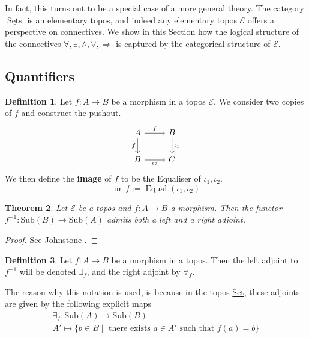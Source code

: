 \documentclass{birkjour}
\theoremstyle{plain}
\newtheorem{thm}{Theorem}[subsection] %
\theoremstyle{definition}
\newtheorem{definition}[thm]{Definition} %
\newcommand{\call}[1]{\mathcal{#1}}
\newcommand{\lto}{\longrightarrow}
\begin{document}
	In fact, this turns out to be a special case of a more general theory. The category $\underline{\operatorname{Sets}}$ is an elementary topos, and indeed any elementary topos $\call{E}$ offers a perspective on connectives. We show in this Section how the logical structure of the connectives $\forall, \exists, \wedge, \vee, \Rightarrow$ is captured by the categorical structure of $\call{E}$.
	\subsection{Quantifiers}
	\begin{definition}\label{def:image}
		Let $f: A \lto B$ be a morphism in a topos $\call{E}$. We consider two copies of $f$ and construct the pushout.
		\begin{equation}
			\begin{tikzcd}
				A\arrow[r,"{f}"]\arrow[d,swap,"{f}"] & B\arrow[d,"{\iota_1}"]\\
				B\arrow[r,swap,"{\iota_2}"] & C
			\end{tikzcd}
		\end{equation}
		We then define the \textbf{image} of $f$ to be the Equaliser of $\iota_1,\iota_2$.
		\begin{equation}
			\operatorname{im}f := \operatorname{Equal}(\iota_1,\iota_2)
		\end{equation}
	\end{definition}
	\begin{thm}
		\label{adj}
		Let $\call{E}$ be a topos and $f:A \to B$ a morphism. Then the functor $f^{-1}: \text{Sub}(B) \to \text{Sub}(A)$ admits both a left and a right adjoint.
	\end{thm}
	\begin{proof}
		See Johnstone \cite[\S A 1.4.10]{Johnstone}.
	\end{proof}
	\begin{definition}
		\label{qunatifiers}
		Let $f:A \to B$ be a morphism in a topos. Then the left adjoint to $f^{-1}$ will be denoted $\exists_f$, and the right adjoint by $\forall_f$.
	\end{definition}
	The reason why this notation is used, is because in the topos \underline{Set}, these adjoints are given by the following explicit maps
	\begin{gather*}
		\exists_f: \text{Sub}(A) \to \text{Sub}(B)\\
		A' \mapsto \lbrace b \in B \mid \text{ there exists }a \in A'\text{ such that }f(a) = b\rbrace
	\end{gather*}
\end{document}
